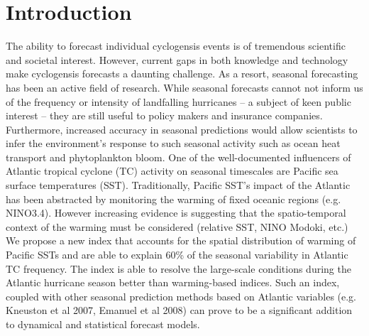 \section{Introduction}
The ability to forecast individual cyclogensis events is of tremendous scientific and societal interest. However, current gaps in both knowledge and technology make cyclogensis forecasts a daunting challenge. As a resort, seasonal forecasting has been an active field of research. While seasonal forecasts cannot not inform us of the frequency or intensity of landfalling hurricanes -- a subject of keen public interest --  they are still useful to policy makers and insurance companies. Furthermore, increased accuracy in seasonal predictions would allow scientists to infer the environment's response to such seasonal activity such as ocean heat transport and phytoplankton bloom. 
One of the well-documented influencers of Atlantic tropical cyclone (TC) activity on seasonal timescales are Pacific sea surface temperatures (SST). Traditionally, Pacific SST's impact of the Atlantic has been abstracted by monitoring the warming of fixed oceanic regions (e.g. NINO3.4). However increasing evidence is suggesting that the spatio-temporal context of the warming must be considered (relative SST, NINO Modoki, etc.)
We propose a new index that accounts for the spatial distribution of warming of Pacific SSTs and are able to explain 60\% of the seasonal variability in Atlantic TC frequency. The index is able to resolve the large-scale conditions during the Atlantic hurricane season better than warming-based indices. Such an index, coupled with other seasonal prediction methods based on Atlantic variables (e.g. Kneuston et al 2007, Emanuel et al 2008) can prove to be a significant addition to dynamical and statistical forecast models.


